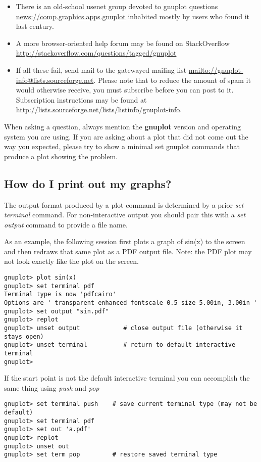 \documentclass[letter,11pt]{article}
\def\http#1{{\small\href{http://#1}{\url{http://#1}}}}
\def\mailto#1{{\small\href{mailto://#1}{\url{mailto://#1}}}}
\def\news#1{\href{news://#1}{\url{news://#1}}}
\newcommand{\news}[1]%
            {\def~{\~{}}\htmladdnormallink{\latex{\url{#1}}\html{\textit{#1}}}%
                {news:#1}%
            }
\newcommand{\mailto}[1]%
            {\htmladdnormallink{\latex{\url{<#1>}}\html{\textit{#1}}}%
                {mailto:#1}%
            }
\newcommand{\http}[1]%
            {\htmladdnormallink{\latex{\url{http://#1}}%
                    \html{\textit{http://#1}}}%
                {http://#1}%
            }
\newcommand{\gnuplot}{\textbf{gnuplot }}
\begin{document}
{\begin{itemize}
\item
There is an old-school usenet group devoted to gnuplot questions
\news{comp.graphics.apps.gnuplot}
inhabited mostly by users who found it last century.

\item
A more browser-oriented help forum may be found on StackOverflow
\http{stackoverflow.com/questions/tagged/gnuplot}

\item
If all these fail, send mail to the gatewayed mailing list
\mailto{gnuplot-info@lists.sourceforge.net}.
Please note that to reduce the amount of spam it would otherwise receive,
you must subscribe before you can post to it. Subscription instructions
may be found at
\http{lists.sourceforge.net/lists/listinfo/gnuplot-info}.

\end{itemize}
When asking a question, always mention the \gnuplot version and
operating system you are using.  If you are asking about a plot that
did not come out the way you expected, please try to show a minimal
set gnuplot commands that produce a plot showing the problem.


\subsection{How do I print out my graphs?}

The output format produced by a plot command is determined by a
prior {\em set terminal} command.  For non-interactive output
you should pair this with a {\em set output} command to provide
a file name.

As an example, the following session first plots a graph of sin(x) to the
screen and then redraws that same plot as a PDF output file.
Note: the PDF plot may not look exactly like the plot on the screen.

\small
\begin{verbatim}
gnuplot> plot sin(x)
gnuplot> set terminal pdf
Terminal type is now 'pdfcairo'
Options are ' transparent enhanced fontscale 0.5 size 5.00in, 3.00in '
gnuplot> set output "sin.pdf"
gnuplot> replot
gnuplot> unset output            # close output file (otherwise it stays open)
gnuplot> unset terminal          # return to default interactive terminal
gnuplot>
\end{verbatim}
\normalsize

If the start point is not the default interactive terminal you
can accomplish the same thing using {\em push} and {\em pop}
\small
\begin{verbatim}
gnuplot> set terminal push    # save current terminal type (may not be default)
gnuplot> set terminal pdf
gnuplot> set out 'a.pdf'
gnuplot> replot
gnuplot> unset out
gnuplot> set term pop         # restore saved terminal type
\end{verbatim}
\normalsize

}
\end{document}
